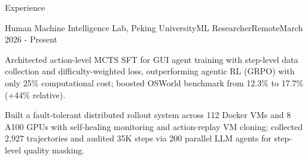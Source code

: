 \documentclass[
	10pt, %
]{resume} %
\begin{document}
\begin{rSection}{Experience}

	\begin{rExperience}{Human Machine Intelligence Lab, Peking University}{ML Researcher}{Remote}{March 2026 - Present}

		\item Architected action-level MCTS SFT for GUI agent training with step-level data collection and difficulty-weighted loss, outperforming agentic RL (GRPO) with only 25\% computational cost; boosted OSWorld benchmark from 12.3\% to 17.7\% (+44\% relative).
		\item Built a fault-tolerant distributed rollout system across 112 Docker VMs and 8 A100 GPUs with self-healing monitoring and action-replay VM cloning; collected 2,927 trajectories and audited 35K steps via 200 parallel LLM agents for step-level quality masking.

	\end{rExperience}

\end{rSection}

\end{document}
